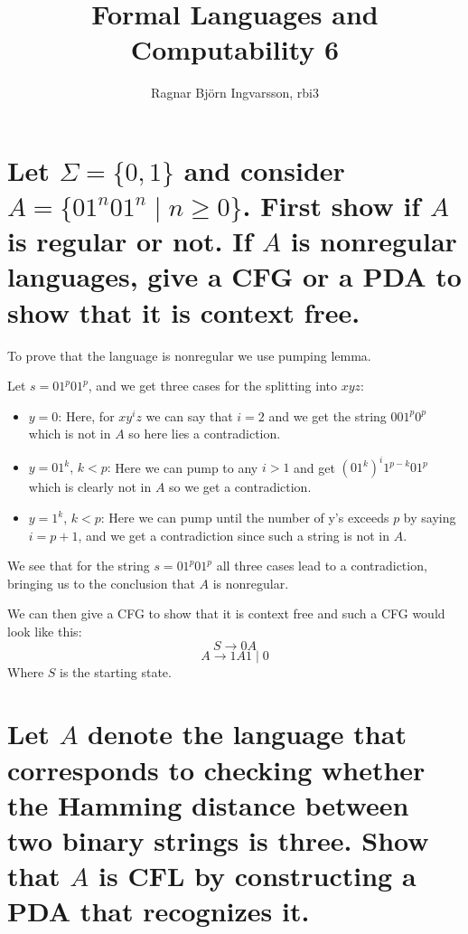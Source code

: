 \documentclass{article}
\title{Formal Languages and Computability 6}
\author{Ragnar Björn Ingvarsson, rbi3}
\begin{document}
\renewcommand\thepage{}
	
	\maketitle

	\newpage
	\setcounter{page}{1}
	\renewcommand\thepage{\arabic{page}}

	\section{Let $\Sigma=\{0,1\}$ and consider $A = \{01^n01^n\mid n\geq0\}$. 
	First show if $A$ is regular or not. If $A$ is nonregular languages, 
	give a CFG or a PDA to show that it is context free.}
	To prove that the language is nonregular we use pumping lemma.

	Let $s = 01^p01^p$, and we get three cases for the splitting into $xyz$:

	\begin{itemize}
		\item{$y=0$:} Here, for $xy^iz$ we can say that $i=2$ and we get the 
			string $001^p0^p$ which is not in $A$ so here lies a contradiction.
		\item{$y=01^k$, $k < p$:} Here we can pump to any $i>1$ and get 
			$(01^k)^i1^{p-k}01^p$ which is clearly not in $A$ so we get a 
			contradiction.
		\item{$y=1^k$, $k < p$:} Here we can pump until the number of y's 
			exceeds $p$ by saying $i=p+1$, and we get a contradiction since 
			such a string is not in $A$.
	\end{itemize}

	We see that for the string $s=01^p01^p$ all three cases lead to a 
	contradiction, bringing us to the conclusion that $A$ is nonregular.

	We can then give a CFG to show that it is context free and such a CFG 
	would look like this:
	\[S\rightarrow 0A\]
	\[A\rightarrow 1A1\mid 0\]
	Where $S$ is the starting state.

	\section{Let $A$ denote the language that corresponds to checking 
	whether the Hamming distance between two binary strings is three. 
	Show that $A$ is CFL by constructing a PDA that recognizes it.}
\end{document}
